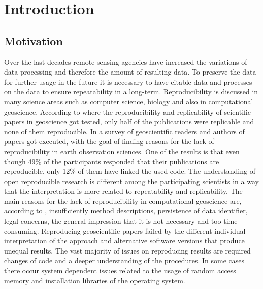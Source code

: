 \documentclass[draft,final]{vutinfth} %
\begin{document}

\tableofcontents %

\mainmatter

\chapter{Introduction}\label{Introduction}
\section{Motivation}\label{Motivation}
Over the last decades remote sensing agencies have increased the variations of data processing and therefore the amount of resulting data. To preserve the data for further usage in the future it is necessary to have citable data and processes on the data to ensure repeatability in a long-term.\cite{6352411} Reproducibility is discussed in many science areas such as computer science, biology and also in computational geoscience. According to \cite{Ostermann2017AdvancingSW} where the reproducibility and replicability of scientific papers in geoscience got tested, only half of the publications were replicable and none of them reproducible. In \cite{Thestateofreproducibility} a survey of geoscientific readers and authors of papers got executed, with the goal of finding reasons for the lack of reproducibility in earth observation sciences. One of the results is that even though 49\% of the participants responded that their publications are reproducible, only 12\% of them have linked the used code. The understanding of open reproducible research is different among the participating scientists in a way that the interpretation is more related to repeatability and replicability. The main reasons for the lack of reproducibility in computational geoscience are, according to \cite{Thestateofreproducibility}, insufficiently method descriptions, persistence of data identifier, legal concerns, the general impression that it is not necessary and too time consuming. 
Reproducing geoscientific papers failed by the different individual interpretation of the approach and alternative software versions that produce unequal results. The vast majority of issues on reproducing results are required changes of code and a deeper understanding of the procedures. In some cases there occur system dependent issues related to the usage of random access memory and installation libraries of the operating system. \cite{Thestateofreproducibility}
\end{document}
